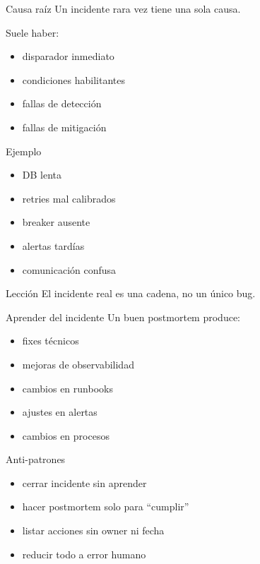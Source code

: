 \documentclass[institutional,screen,none]{ua-engineering-v6-beamer}
\begin{document}

\begin{frame}{Causa raíz}
Un incidente rara vez tiene una sola causa.

\pause

Suele haber:
\begin{itemize}
\item disparador inmediato
\item condiciones habilitantes
\item fallas de detección
\item fallas de mitigación
\end{itemize}
\end{frame}

\begin{frame}{Ejemplo}
\begin{itemize}
\item DB lenta
\item retries mal calibrados
\item breaker ausente
\item alertas tardías
\item comunicación confusa
\end{itemize}

\pause

\begin{block}{Lección}
El incidente real es una cadena, no un único bug.
\end{block}
\end{frame}


\begin{frame}{Aprender del incidente}
Un buen postmortem produce:
\begin{itemize}
\item fixes técnicos
\item mejoras de observabilidad
\item cambios en runbooks
\item ajustes en alertas
\item cambios en procesos
\end{itemize}
\end{frame}

\begin{frame}{Anti-patrones}
\begin{itemize}
\item cerrar incidente sin aprender
\item hacer postmortem solo para “cumplir”
\item listar acciones sin owner ni fecha
\item reducir todo a error humano
\end{itemize}
\end{frame}
\end{document}
